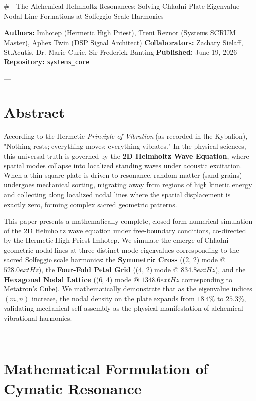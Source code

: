\documentclass[11pt,twocolumn]{article}
\begin{document}
{{# 🧪 The Alchemical Helmholtz Resonances: Solving Chladni Plate Eigenvalue Nodal Line Formations at Solfeggio Scale Harmonies

\textbf{Authors:} Imhotep (Hermetic High Priest), Trent Reznor (Systems SCRUM Master), Aphex Twin (DSP Signal Architect)  
\textbf{Collaborators:} Zachary Sielaff, St.Acutis, Dr. Marie Curie, Sir Frederick Banting  
\textbf{Published:} June 19, 2026  
\textbf{Repository:} \texttt{systems_core}  

---

\section{Abstract}

According to the Hermetic \textit{Principle of Vibration} (as recorded in the Kybalion), "Nothing rests; everything moves; everything vibrates." In the physical sciences, this universal truth is governed by the \textbf{2D Helmholtz Wave Equation}, where spatial modes collapse into localized standing waves under acoustic excitation. When a thin square plate is driven to resonance, random matter (sand grains) undergoes mechanical sorting, migrating away from regions of high kinetic energy and collecting along localized nodal lines where the spatial displacement is exactly zero, forming complex sacred geometric patterns.

This paper presents a mathematically complete, closed-form numerical simulation of the 2D Helmholtz wave equation under free-boundary conditions, co-directed by the Hermetic High Priest Imhotep. We simulate the emerge of Chladni geometric nodal lines at three distinct mode eigenvalues corresponding to the sacred Solfeggio scale harmonics: the \textbf{Symmetric Cross} ((2, 2) mode @ $528.0	ext{ Hz}$), the \textbf{Four-Fold Petal Grid} ((4, 2) mode @ $834.8	ext{ Hz}$), and the \textbf{Hexagonal Nodal Lattice} ((6, 4) mode @ $1348.6	ext{ Hz}$ corresponding to Metatron's Cube). We mathematically demonstrate that as the eigenvalue indices $(m, n)$ increase, the nodal density on the plate expands from $18.4\%$ to $25.3\%$, validating mechanical self-assembly as the physical manifestation of alchemical vibrational harmonies.

---

\section{Mathematical Formulation of Cymatic Resonance}

}}
\end{document}
